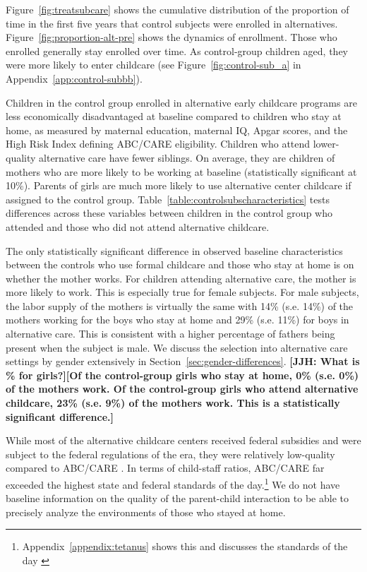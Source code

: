 Figure~\ref{fig:treatsubcare} shows the cumulative distribution of the proportion of time in the first five years that control subjects were enrolled in alternatives. Figure~\ref{fig:proportion-alt-pre} shows the dynamics of enrollment. Those who enrolled generally stay enrolled over time. As control-group children aged, they were more likely to enter childcare (see Figure~\ref{fig:control-sub_a} in Appendix~\ref{app:control-subbb}).

Children in the control group enrolled in alternative early childcare programs are less economically disadvantaged at baseline compared to children who stay at home, as measured by maternal education, maternal IQ, Apgar scores, and the High Risk Index defining ABC/CARE eligibility. Children who attend lower-quality alternative care have fewer siblings. On average, they are children of mothers who are more likely to be working at baseline (statistically significant at 10\%). Parents of girls are much more likely to use alternative center childcare if assigned to the control group. Table~\ref{table:controlsubscharacteristics} tests differences across these variables between children in the control group who attended and those who did not attend alternative childcare.

The only statistically significant difference in observed baseline characteristics between the controls who use formal childcare and those who stay at home is on whether the mother works. For children attending alternative care, the mother is more likely to work. This is especially true for female subjects. For male subjects, the labor supply of the mothers is virtually the same with 14\% (s.e. 14\%) of the mothers working for the boys who stay at home and 29\% (s.e. 11\%) for boys in alternative care. This is consistent with a higher percentage of fathers being present when the subject is male. We discuss the selection into alternative care settings by gender extensively in Section~\ref{sec:gender-differences}. \textbf{[JJH: What is \% for girls?][Of the control-group girls who stay at home, 0\% (s.e. 0\%) of the mothers work. Of the control-group girls who attend alternative childcare, 23\% (s.e. 9\%) of the mothers work. This is a statistically significant difference.]}

While most of the alternative childcare centers received federal subsidies and were subject to the federal regulations of the era, they were relatively low-quality compared to ABC/CARE \citep{Burchinal_etal_1989_CD_Daycare-Pre-K-Dev}. In terms of child-staff ratios, ABC/CARE far exceeded the highest state and federal standards of the day.\footnote{Appendix~\ref{appendix:tetanus} shows this and discusses the standards of the day \citep{Department-of-Health_1968_DayCareRequirements,NCGA_1971_House-Bill-100,Ramey-et-al_1977_Intro-to-ABC,Ramey_Campbell_1979_SR,Ramey_McGinness_etal_1982_Abecedarianapproach,Burchinal_Campbell_etal_1997_CD}} We do not have baseline information on the quality of the parent-child interaction to be able to precisely analyze the environments of those who stayed at home.

